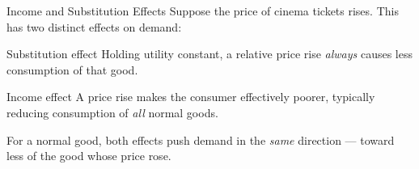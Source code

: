 \documentclass[11pt,aspectratio=169]{beamer}
\begin{document}
\begin{frame}{Income and Substitution Effects}
  Suppose the price of cinema tickets rises. This has two distinct effects on demand:
  \begin{block}{Substitution effect}
    Holding utility constant, a relative price rise \emph{always} causes less consumption of that good.
  \end{block}
  \begin{block}{Income effect}
    A price rise makes the consumer effectively poorer, typically reducing consumption of \emph{all} normal goods.
  \end{block}
  \vspace{0.3em}
  \centering
  For a normal good, both effects push demand in the \emph{same} direction --- toward less of the good whose price rose.
\end{frame}

\end{document}
